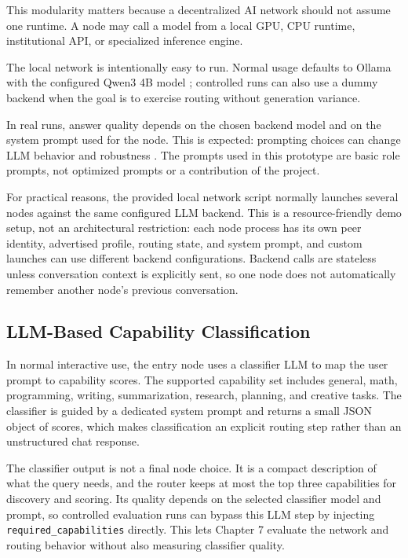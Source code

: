 This modularity matters because a decentralized AI network should not assume
one runtime. A node may call a model from a local GPU, CPU runtime,
institutional API, or specialized inference engine.

The local network is intentionally easy to run. Normal usage defaults to Ollama
with the configured Qwen3 4B model \citep{ollama}; controlled runs can also use
a dummy backend when the goal is to exercise routing without generation
variance.

In real runs, answer quality depends on the chosen backend model and on the
system prompt used for the node. This is expected: prompting choices can change
LLM behavior and robustness \citep{schulhoff2025promptreport,zhu2024promptrobust}.
The prompts used in this prototype are basic role prompts, not optimized prompts
or a contribution of the project.

For practical reasons, the provided local network script normally launches
several nodes against the same configured LLM backend. This is a
resource-friendly demo setup, not an architectural restriction: each node process
has its own peer identity, advertised profile, routing state, and system prompt,
and custom launches can use different backend configurations. Backend calls are
stateless unless conversation context is explicitly sent, so one node does not
automatically remember another node's previous conversation.

\subsection{LLM-Based Capability Classification}

In normal interactive use, the entry node uses a classifier LLM to map the user
prompt to capability scores. The supported capability set includes general,
math, programming, writing, summarization, research, planning, and creative
tasks. The classifier is guided by a dedicated system prompt and returns a small
JSON object of scores, which makes classification an explicit routing step
rather than an unstructured chat response.

The classifier output is not a final node choice. It is a compact description of
what the query needs, and the router keeps at most the top three capabilities
for discovery and scoring. Its quality depends on the selected classifier model
and prompt, so controlled evaluation runs can bypass this LLM step by injecting
\texttt{required\_capabilities} directly. This lets Chapter 7 evaluate the
network and routing behavior without also measuring classifier quality.

